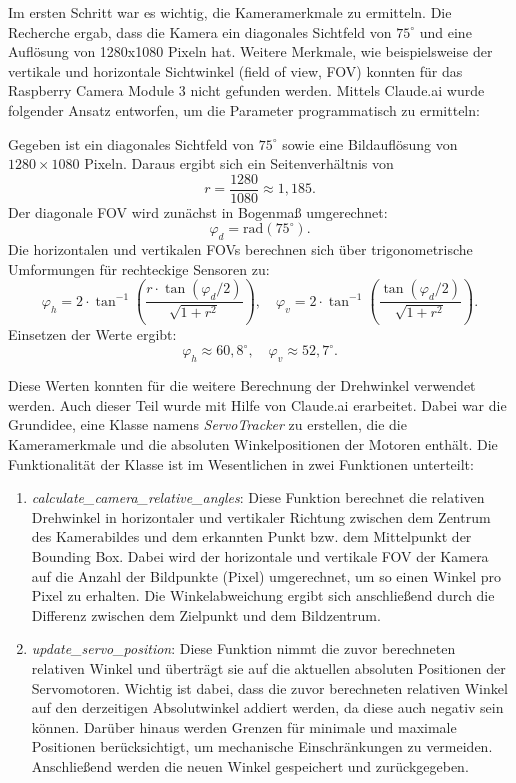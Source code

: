 Im ersten Schritt war es wichtig, die Kameramerkmale zu ermitteln. Die Recherche ergab, dass die Kamera ein diagonales Sichtfeld von $75^\circ$ und eine Auflösung von 1280x1080 Pixeln hat. Weitere Merkmale, wie beispielsweise der vertikale und horizontale Sichtwinkel (field of view, FOV) konnten für das Raspberry Camera Module 3 nicht gefunden werden. Mittels Claude.ai wurde folgender Ansatz entworfen, um die Parameter programmatisch zu ermitteln: \newline

Gegeben ist ein diagonales Sichtfeld von $75^\circ$ sowie eine Bildauflösung von $1280 \times 1080$ Pixeln. Daraus ergibt sich ein Seitenverhältnis von
\[
r = \frac{1280}{1080} \approx 1{,}185.
\]
Der diagonale FOV wird zunächst in Bogenmaß umgerechnet:
\[
\varphi_d = \mathrm{rad}(75^\circ).
\]
Die horizontalen und vertikalen FOVs berechnen sich über trigonometrische Umformungen für rechteckige Sensoren zu:
\[
\varphi_h = 2 \cdot \tan^{-1} \left( \frac{r \cdot \tan(\varphi_d/2)}{\sqrt{1 + r^2}} \right), \quad
\varphi_v = 2 \cdot \tan^{-1} \left( \frac{\tan(\varphi_d/2)}{\sqrt{1 + r^2}} \right).
\]
Einsetzen der Werte ergibt:
\[
\varphi_h \approx 60{,}8^\circ, \quad \varphi_v \approx 52{,}7^\circ.
\]

Diese Werten konnten für die weitere Berechnung der Drehwinkel verwendet werden. Auch dieser Teil wurde mit Hilfe von Claude.ai erarbeitet. Dabei war die Grundidee, eine Klasse namens \textit{ServoTracker} zu erstellen, die die Kameramerkmale und die absoluten Winkelpositionen der Motoren enthält. Die Funktionalität der Klasse ist im Wesentlichen in zwei Funktionen unterteilt:

\begin{enumerate}
    \item \textit{calculate\_camera\_relative\_angles}: Diese Funktion berechnet die relativen Drehwinkel in horizontaler und vertikaler Richtung zwischen dem Zentrum des Kamerabildes und dem erkannten Punkt bzw. dem Mittelpunkt der Bounding Box. Dabei wird der horizontale und vertikale FOV der Kamera auf die Anzahl der Bildpunkte (Pixel) umgerechnet, um so einen Winkel pro Pixel zu erhalten. Die Winkelabweichung ergibt sich anschließend durch die Differenz zwischen dem Zielpunkt und dem Bildzentrum.
    
    \item \textit{update\_servo\_position}: Diese Funktion nimmt die zuvor berechneten relativen Winkel und überträgt sie auf die aktuellen absoluten Positionen der Servomotoren. Wichtig ist dabei, dass die zuvor berechneten relativen Winkel auf den derzeitigen Absolutwinkel addiert werden, da diese auch negativ sein können. Darüber hinaus werden Grenzen für minimale und maximale Positionen berücksichtigt, um mechanische Einschränkungen zu vermeiden. Anschließend werden die neuen Winkel gespeichert und zurückgegeben.
\end{enumerate}

